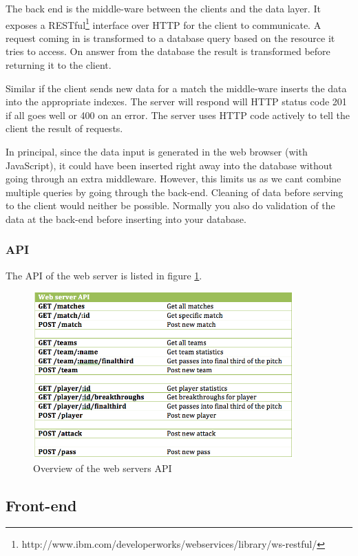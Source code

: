 The back end is the middle-ware between the clients and the data layer. It exposes a RESTful\footnote{http://www.ibm.com/developerworks/webservices/library/ws-restful/} interface over HTTP for the client to communicate. A request coming in is transformed to a database query based on the resource it tries to access. On answer from the database the result is transformed before returning it to the client. 

Similar if the client sends new data for a match the middle-ware inserts the data into the appropriate indexes. The server will respond will HTTP status code 201 if all goes well or 400 on an error. The server uses HTTP code actively to tell the client the result of requests.

In principal, since the data input is generated in the web browser (with JavaScript), it could have been inserted right away into the database without going through an extra middleware. However, this limits us as we cant combine multiple queries by going through the back-end. Cleaning of data before serving to the client would neither be possible. Normally you also do validation of the data at the back-end before inserting into your database.

\subsubsection{API}

The API of the web server is listed in figure \ref{fig:api}.
\begin{figure}[ht!]
\centering
\includegraphics[width=100mm]{images/implementation/API.png}
\caption{Overview of the web servers API}
\label{fig:api}
\end{figure}

\subsection{Front-end}

